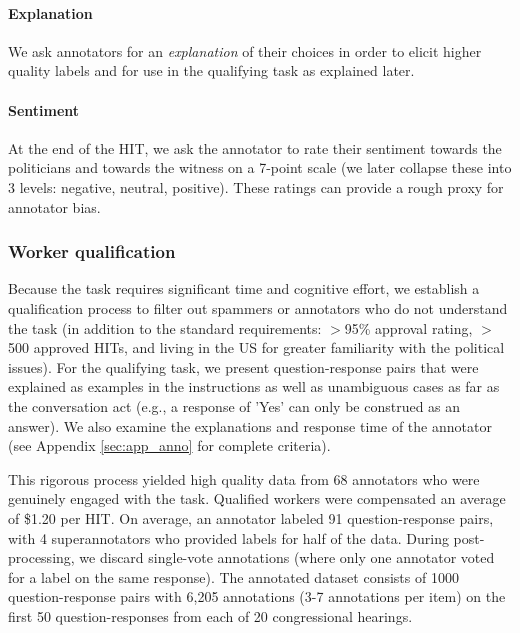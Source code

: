 \paragraph{Explanation} We ask annotators for an \emph{explanation} of their choices in order to elicit higher quality labels \cite{McDonnell:2016} and for use in the qualifying task as explained later. 

\paragraph{Sentiment} At the end of the HIT, we ask the annotator to rate their sentiment towards the politicians and towards the witness on a 7-point scale (we later collapse these into 3 levels: negative, neutral, positive). These ratings can provide a rough proxy for annotator bias. 

\subsubsection{Worker qualification}
Because the task requires significant time and cognitive effort, we establish a qualification process to filter out spammers or annotators who do not understand the task (in addition to the standard requirements: $>$95\% approval rating, $>$500 approved HITs, and living in the US for greater familiarity with the political issues). For the qualifying task, we present question-response pairs that were explained as examples in the instructions as well as unambiguous cases as far as the conversation act (e.g., a response of 'Yes' can only be construed as an answer). We also examine the explanations and response time of the annotator (see Appendix \ref{sec:app_anno} for complete criteria). 

This rigorous process yielded high quality data from 68 annotators who were genuinely engaged with the task. Qualified workers were compensated an average of \$1.20 per HIT. On average, an annotator labeled 91 question-response pairs, with 4 superannotators who provided labels for half of the data. During post-processing, we discard single-vote annotations (where only one annotator voted for a label on the same response). The annotated dataset consists of 1000 question-response pairs with 6,205 annotations (3-7 annotations per item) on the first 50 question-responses from each of 20 congressional hearings. 

